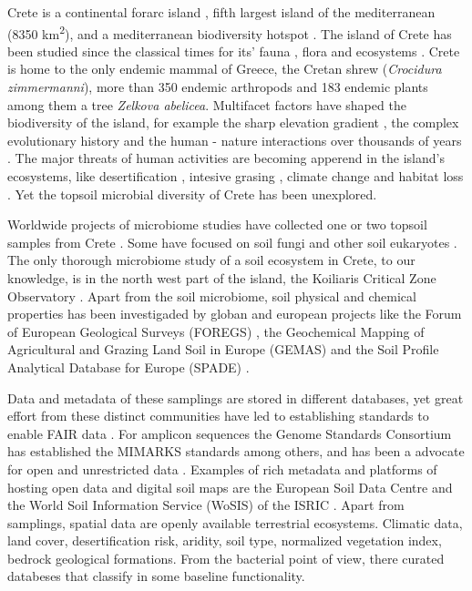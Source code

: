 \documentclass[unnumsec,webpdf,contemporary,large]{oup-authoring-template}%
\theoremstyle{thmstyleone}%
\theoremstyle{thmstyletwo}%
\theoremstyle{thmstylethree}%
\begin{document}
Crete is a continental forarc island \cite{ali2016}, fifth largest island of the mediterranean (8350 km\textsuperscript{2}),
and a mediterranean biodiversity hotspot \cite{myers2000biodiversity}.
The island of Crete has been studied since the classical times for its'
fauna \cite{Sidiropoulos_Polymeni_Legakis_2017,Anastasiou2018Tenebrionid}, flora \cite{Krimbas_2005} and ecosystems \cite{Grove1993}.
Crete is home to the only endemic mammal of Greece, the Cretan shrew (\textit{Crocidura zimmermanni}),
more than 350 endemic arthropods \cite{bolanakis2024} and 183 endemic plants \cite{Kougioumoutzis2020}
among them a tree \textit{Zelkova abelicea}. Multifacet factors have shaped the
biodiversity of the island, for example the sharp elevation gradient \cite{trigas2013, FAZAN2017},
the complex evolutionary history \cite{POULAKAKIS2002} and the human - nature
interactions over thousands of years \cite{Vogiatzakis2008_med, Sfenthourakis2017}.
The major threats of human activities are becoming apperend in the island's ecosystems,
like desertification \cite{KARAMESOUTI2018266}, intesive grasing \cite{JouffroyBapicot2016},
climate change \cite{Kougioumoutzis2020,Vogiatzakis2016} and habitat loss \cite{ISPIKOUDIS1993259}.
Yet the topsoil microbial diversity of Crete has been unexplored.

Worldwide projects of microbiome studies have collected one or two topsoil
samples from Crete \cite{Vasar2022, Labouyrie2023, Bahram2018, Orgiazzi2018}.
Some have focused on soil fungi \cite{Mikryukov2023, Davison2021, Tedersoo2021}
and other soil eukaryotes \cite{Aslani2022}.
The only thorough microbiome study of a soil ecosystem in Crete, to our knowledge,
is in the north west part of the island, the Koiliaris Critical Zone Observatory \cite{tsiknia2014}.
Apart from the soil microbiome, soil physical and chemical properties has been
investigaded by globan and european projects like the Forum of European Geological Surveys
(FOREGS) \cite{nerc19017}, the Geochemical Mapping of Agricultural and Grazing Land
Soil in Europe (GEMAS) \cite{REIMANN2018302} and the Soil Profile Analytical
Database for Europe (SPADE) \cite{Hiederer2006}.

Data and metadata of these samplings are stored in different databases, yet 
great effort from these distinct communities have led to establishing standards
to enable FAIR data \cite{Wilkinson2016}. For amplicon sequences the Genome Standards
Consortium \cite{Field2011} has established the MIMARKS \cite{yilmaz2011minimum}
standards among others, and has been a advocate for open and unrestricted data \cite{Amann2019}.
Examples of rich metadata and platforms of hosting open data and digital soil maps are the 
European Soil Data Centre \cite{Panagos2022} and the World Soil Information
Service (WoSIS) of the ISRIC \cite{Batjes2024}. Apart from samplings,
spatial data are openly available terrestrial ecosystems.
Climatic data, land cover, desertification risk, aridity, soil type, normalized
vegetation index, bedrock geological formations. From the bacterial point of view, 
there curated databeses that classify in some baseline functionality. 
\end{document}
